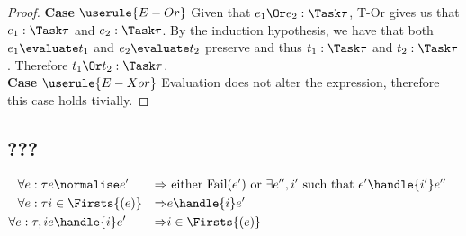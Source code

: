 \begin{proof}
  \noindent\textbf{Case} $\userule{E-Or}$
      Given that $e_1\Or e_2:\Task\tau$, T-Or gives us that $e_1:\Task\tau$ and
      $e_2:\Task\tau$. By the induction hypothesis, we have that both
      $e_1\evaluate t_1$ and $e_2\evaluate t_2$ preserve and thus $t_1:\Task\tau$
      and $t_2:\Task\tau$. Therefore $t_1\Or t_2:\Task\tau$.\\

  \noindent\textbf{Case} $\userule{E-Xor}$
      Evaluation does not alter the expression, therefore this case holds tivially.
\end{proof}

\subsection{???}

\begin{align*}
  \forall e:\tau & e \normalise e' &\implies& \text{ either Fail}(e') \text{ or } \exists e'',i' \text{ such that } e'\handle{i'}e''&\\
  \forall e:\tau & i\in\Firsts{(e)} &\implies& e\handle{i}e'\\
  \forall e:\tau, i & e\handle{i}e' &\implies& i\in\Firsts{(e)}
\end{align*}
